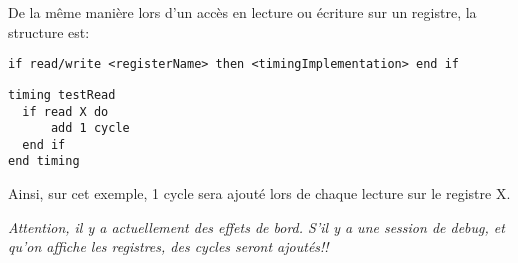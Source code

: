 De la même manière lors d'un accès en lecture ou écriture sur un registre, la structure est:
\begin{verbatim}
if read/write <registerName> then <timingImplementation> end if
\end{verbatim}
\begin{lstlisting}
timing testRead
  if read X do
      add 1 cycle
  end if
end timing
\end{lstlisting}
Ainsi, sur cet exemple, 1 cycle sera ajouté lors de chaque lecture sur le registre X.

\emph{Attention, il y a actuellement des effets de bord. S'il y a une session de debug, et qu'on affiche les registres, des cycles seront ajoutés!!}

